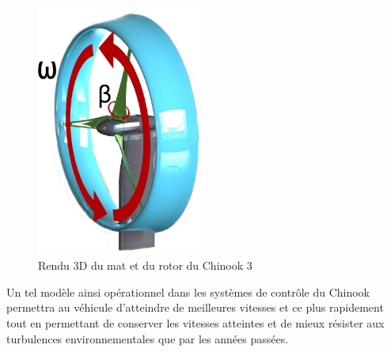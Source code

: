 \begin{figure}[H]
  \centering
  \includegraphics[width=0.5\textwidth]{images/mat_rotor_annote.jpg}
  \caption[Mat et Rotor du Chinook 3]{Rendu 3D du mat et du rotor du Chinook 3}
  \label{fig:matRotor}
\end{figure}

Un tel modèle ainsi opérationnel dans les systèmes de contrôle du Chinook permettra au véhicule d'atteindre de meilleures vitesses et ce plus rapidement tout en permettant de conserver les vitesses atteintes et de mieux résister aux turbulences environnementales que par les années passées.


